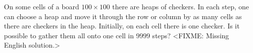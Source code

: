 \problem
On some cells of a board $100 \times 100$ there are heaps of checkers.
In each step, one can choose a heap and move it through the row or column by as
many cells as there are checkers in the heap.
Initially, on each cell there is one checker.
Is it possible to gather them all onto one cell in $9999$ steps?
\solution
<FIXME: Missing English solution.>
\endproblem
